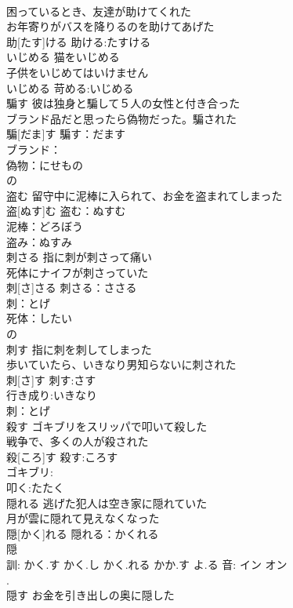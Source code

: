 \documentclass[8pt]{extreport}
\begin{document}
\begin{CJK}{UTF8}{min}
\\	困っているとき、友達が助けてくれた 
\\	お年寄りがバスを降りるのを助けてあげた 
\\	助[たす]ける			助ける:たすける
\\	いじめる	猫をいじめる 
\\	子供をいじめてはいけません 
\\	いじめる			苛める:いじめる
\\	騙す	彼は独身と騙して５人の女性と付き合った 
\\	ブランド品だと思ったら偽物だった。騙された 
\\	騙[だま]す			騙す：だます
\\	ブランド：
\\	偽物：にせもの
\\	の
\\	盗む	留守中に泥棒に入られて、お金を盗まれてしまった 
\\	盗[ぬす]む			盗む：ぬすむ
\\	泥棒：どろぼう
\\	盗み：ぬすみ
\\	刺さる	指に刺が刺さって痛い 
\\	死体にナイフが刺さっていた 
\\	刺[さ]さる			刺さる：ささる
\\	刺：とげ
\\	死体：したい
\\	の 
\\	刺す	指に刺を刺してしまった 
\\	歩いていたら、いきなり男知らないに刺された 
\\	刺[さ]す			刺す:さす
\\	行き成り:いきなり
\\	刺：とげ
\\	殺す	ゴキブリをスリッパで叩いて殺した 
\\	戦争で、多くの人が殺された 
\\	殺[ころ]す			殺す:ころす
\\	ゴキブリ:
\\	叩く:たたく
\\	隠れる	逃げた犯人は空き家に隠れていた 
\\	月が雲に隠れて見えなくなった 
\\	隠[かく]れる			隠れる：かくれる
\\	隠 
\\	訓: かく.す かく.し かく.れる かか.す よ.る 音: イン オン 
\\	[隱].	
\\	隠す	お金を引き出しの奥に隠した 

\end{CJK}
\end{document}
